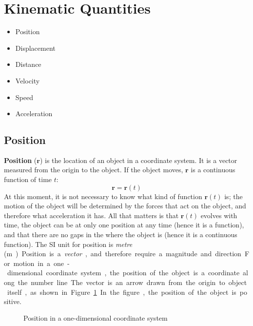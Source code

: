 \section{Kinematic Quantities}

\begin{itemize}
\item Position
\item Displacement
\item Distance
\item Velocity
\item Speed
\item Acceleration
\end{itemize}


\subsection{Position}

\textbf{Position} ($\mathbf r$) is the location of an object in a coordinate
system. It is a vector measured from the origin to the object. If the object
moves, $\mathbf r$ is a continuous function of time $t$:
\begin{equation}
  \mathbf r=\mathbf r(t)
\end{equation}
At this moment, it is not necessary to know what kind of function $\mathbf r(t)$
is; the motion of the object will be determined by the forces that act on the
object, and therefore what acceleration it has. All that matters is that
$\mathbf r(t)$ evolves with time, the object can be at only one position at any
time (hence it is a function), and that there are no gaps in the where the
object is (hence it is a continuous function). The SI unit for position is
\emph{metre} (\si\metre).

Position is a \emph{vector}, and therefore require a magnitude and direction.
For motion in a one-dimensional coordinate system, the position of the object
is a coordinate along the number line. The vector is an arrow drawn from
the origin to object itself, as shown in Figure~\ref{fig:1d-position}. In
the figure, the position of the object is positive.

\begin{figure}[ht]
  \centering
  \caption{Position in a one-dimensional coordinate system}
  \label{fig:1d-position}
\end{figure}

